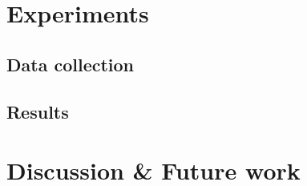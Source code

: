 \documentclass[letterpaper, 10 pt, conference]{ieeeconf}  %
\begin{document}
	\section{Experiments} 
	\label{sec:experiments} 
	
	\subsection{Data collection} 
	\label{sec:data_collection}
	
	\subsection{Results} 
	\label{sec:results}
	
	\section{Discussion \& Future work}
	\label{sec:discussion_and_future_work}
	
	
		
	
\end{document}

